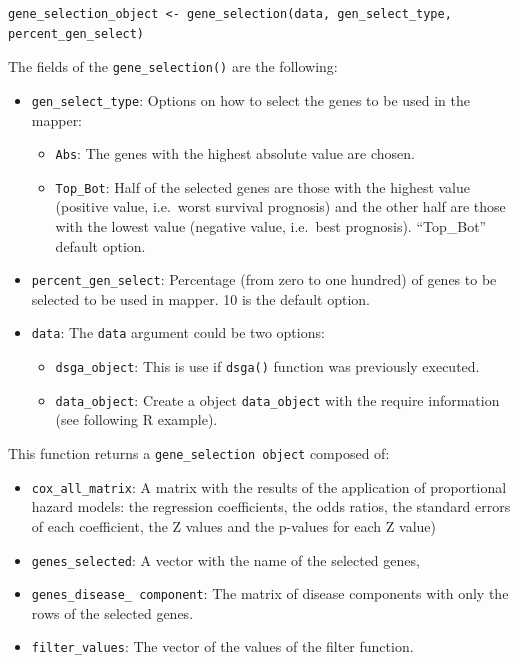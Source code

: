 \begin{verbatim}
gene_selection_object <- gene_selection(data, gen_select_type, percent_gen_select)
\end{verbatim}

The fields of the \texttt{gene\_selection()} are the following:

\begin{itemize}
\tightlist
\item
  \texttt{gen\_select\_type}: Options on how to select the genes to be used in the mapper:

  \begin{itemize}
  \tightlist
  \item
    \texttt{Abs}: The genes with the highest absolute value are chosen.
  \item
    \texttt{Top\_Bot}: Half of the selected genes are those with the highest value (positive value, i.e.~worst survival prognosis) and the other half are those with the lowest value (negative value, i.e.~best prognosis). ``Top\_Bot'' default option.
  \end{itemize}
\item
  \texttt{percent\_gen\_select}: Percentage (from zero to one hundred) of genes to be selected to be used in mapper. 10 is the default option.
\item
  \texttt{data}: The \texttt{data} argument could be two options:

  \begin{itemize}
  \tightlist
  \item
    \texttt{dsga\_object}: This is use if \texttt{dsga()} function was previously executed.
  \item
    \texttt{data\_object}: Create a object \texttt{data\_object} with the require information (see following R example).
  \end{itemize}
\end{itemize}

This function returns a \texttt{gene\_selection\ object} composed of:

\begin{itemize}
\tightlist
\item
  \texttt{cox\_all\_matrix}: A matrix with the results of the application of proportional hazard models: the regression coefficients, the odds ratios, the standard errors of each coefficient, the Z values and the p-values for each Z value)
\item
  \texttt{genes\_selected}: A vector with the name of the selected genes,
\item
  \texttt{genes\_disease\_\ component}: The matrix of disease components with only the rows of the selected genes.
\item
  \texttt{filter\_values}: The vector of the values of the filter function.
\end{itemize}

